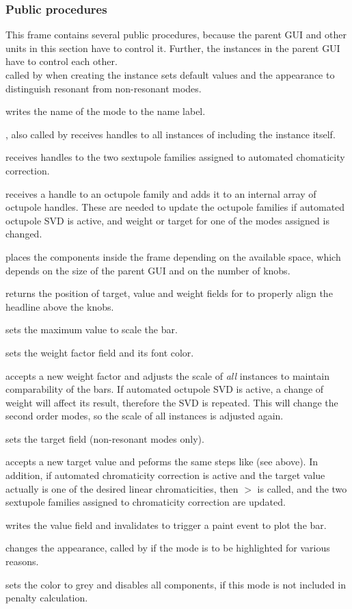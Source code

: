 \documentclass[12pt]{article}
\newcommand\code[1]{{\tt #1}}
\newcommand\guifco[1]{{\color{violet}\code{#1}}}
\newcommand{\unico}[1]{{\color{burntorange}\code{#1}}}
\newcommand{\prcod}[2]{\opauni{#1}$>$\unico{#2}}
\newcommand{\opagui}[1]{\colorbox{blue!20}{{\color{black}\code{#1}}}}
\newcommand{\ogui}[1]{\hyperref[#1]{\opagui{#1}}}
\newcommand{\opaguif}[1]{\colorbox{violet!30}{{\color{black}\code{#1}}}}
\newcommand{\oguif}[1]{\hyperref[#1]{\opaguif{#1}}}
\newcommand{\opauni}[1]{\colorbox{orange!30}{{\color{black}\code{#1}}}}
\newcommand{\ppro}[1]{\subsubsection*{Public procedures} #1}
\begin{document}
\ppro{
This frame contains several public procedures, because the parent GUI \ogui{opachroma} and other units in this section have to control it. Further, the instances in the parent GUI have to control each other.\\

\guifco{Init} called by \ogui{opachroma} when creating the instance sets default values and the appearance to distinguish resonant from non-resonant modes.

\guifco{SetLab} writes the name of the mode to the name label.

\guifco{Brothers}, also called by \ogui{opachroma} receives handles to all instances of \oguif{chamframe} including the instance itself.

\guifco{getChromSexHandles} receives handles to the two sextupole families assigned to automated chomaticity correction.

\guifco{passOctupoleHandle} receives a handle to an octupole family and adds it to an internal array of octupole handles. These are needed to update the octupole families if automated octupole SVD is active, and weight or target for one of the modes assigned is changed.

\guifco{SetSize} places the components inside the frame depending on the available space, which depends on the size of the parent GUI and on the number of knobs.

\guifco{getTabs} returns the position of target, value and weight fields for \ogui{opachroma} to properly align the headline above the knobs.

\guifco{SetValmax} sets the maximum value to scale the bar. 

\guifco{SetWeight} sets the weight factor field and its font color.

\guifco{UpdateWeight} accepts a new weight factor and adjusts the scale of {\em all} \oguif{chamframe} instances to maintain comparability of the bars. 
If automated octupole SVD is active, a change of weight will affect its result, therefore the SVD is repeated. This will change the second order modes, so the scale of all instances is adjusted again.

\guifco{SetTarget} sets the target field (non-resonant modes only).

\guifco{UpdateTarget} accepts a new target value and peforms the same steps like \guifco{UpdateWeight} (see above). In addition, if automated chromaticity correction is active and the target value actually is one of the desired linear chromaticities, then \prcod{chromlib}{ChromCorrect} is called, and the two sextupole families assigned to chromaticity correction are updated.

\guifco{UpdateHam} writes the value field and invalidates to trigger a paint event to plot the bar.

\guifco{mySetColor} changes the appearance, called by \ogui{opachroma} if the mode is to be highlighted for various reasons.

\guifco{MinInclude} sets the color to grey and disables all components, if this mode is not included in penalty calculation.
}
\end{document}
